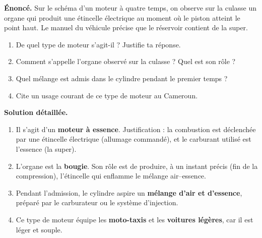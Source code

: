 \documentclass[11pt]{article}
\begin{document}
\begin{exoresolu}
\textbf{Énoncé.} Sur le schéma d'un moteur à quatre temps, on observe sur la culasse un organe qui produit une étincelle électrique au moment où le piston atteint le point haut. Le manuel du véhicule précise que le réservoir contient de la super.
\begin{enumerate}
\item De quel type de moteur s'agit-il ? Justifie ta réponse.
\item Comment s'appelle l'organe observé sur la culasse ? Quel est son rôle ?
\item Quel mélange est admis dans le cylindre pendant le premier temps ?
\item Cite un usage courant de ce type de moteur au Cameroun.
\end{enumerate}
\tcblower
\textbf{Solution détaillée.}
\begin{enumerate}
\item Il s'agit d'un \textbf{moteur à essence}. Justification : la combustion est déclenchée par une étincelle électrique (allumage commandé), et le carburant utilisé est l'essence (la super).
\item L'organe est la \textbf{bougie}. Son rôle est de produire, à un instant précis (fin de la compression), l'étincelle qui enflamme le mélange air--essence.
\item Pendant l'admission, le cylindre aspire un \textbf{mélange d'air et d'essence}, préparé par le carburateur ou le système d'injection.
\item Ce type de moteur équipe les \textbf{moto-taxis} et les \textbf{voitures légères}, car il est léger et souple.
\end{enumerate}
\end{exoresolu}
\end{document}
